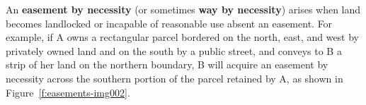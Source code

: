 An \textbf{easement by necessity} (or sometimes \textbf{way by necessity})
arises when land becomes landlocked or incapable of reasonable use absent an
easement. For example, if A owns a rectangular parcel bordered on the north,
east, and west by privately owned land and on the south by a public street, and
conveys to B a strip of her land on the northern boundary, B will acquire an
easement by necessity across the southern portion of the parcel retained by A,
as shown in Figure~\ref{f:easements-img002}.



